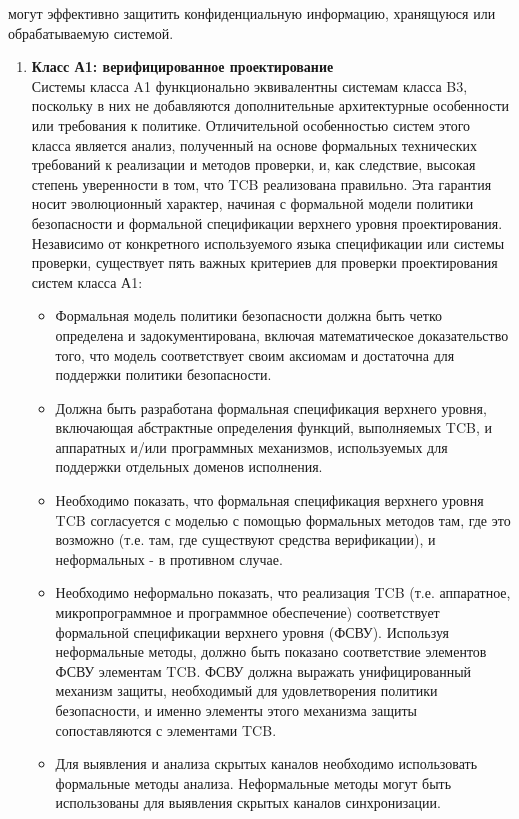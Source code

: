 \begin{enumerate}
	могут эффективно защитить конфиденциальную информацию, хранящуюся или обрабатываемую системой.
	\begin{enumerate}
		\item{\textbf{Класс А1: верифицированное проектирование}}\\
		Системы класса A1 функционально эквивалентны системам класса B3, поскольку в них не добавляются дополнительные архитектурные особенности или требования к политике. Отличительной 
		особенностью систем этого класса является анализ, полученный на основе формальных технических требований к реализации и методов проверки, и, как следствие, высокая степень 
		уверенности в том, что TCB реализована правильно. Эта гарантия носит эволюционный характер, начиная с формальной модели политики безопасности и формальной спецификации верхнего 
		уровня проектирования. Независимо от конкретного используемого языка спецификации или системы проверки, существует пять важных критериев для проверки проектирования систем класса А1:
		\begin{itemize}
			\item{}  Формальная модель политики безопасности должна быть четко определена и задокументирована, включая математическое доказательство того, что модель соответствует 
			своим аксиомам и достаточна для поддержки политики безопасности.
			\item{} Должна быть разработана формальная спецификация верхнего уровня, включающая абстрактные определения функций, выполняемых TCB, и аппаратных и/или программных механизмов, 
			используемых для поддержки отдельных доменов исполнения.
			\item{} Необходимо показать, что формальная спецификация верхнего уровня TCB согласуется с моделью с помощью формальных методов там, где это возможно 
			(т.е. там, где существуют средства верификации), и неформальных - в противном случае.
			\item{} Необходимо неформально показать, что реализация TCB (т.е. аппаратное, микропрограммное и программное обеспечение) соответствует формальной спецификации верхнего уровня (ФСВУ).
			Используя неформальные методы, должно быть показано соответствие элементов ФСВУ элементам TCB. ФСВУ должна выражать унифицированный механизм защиты, необходимый для удовлетворения политики 
			безопасности, и именно элементы этого механизма защиты сопоставляются с элементами TCB.
			\item{} Для выявления и анализа скрытых каналов необходимо использовать формальные методы анализа. Неформальные методы могут быть использованы для выявления скрытых каналов синхронизации. 

\end{itemize}
\end{enumerate}
\end{enumerate}
